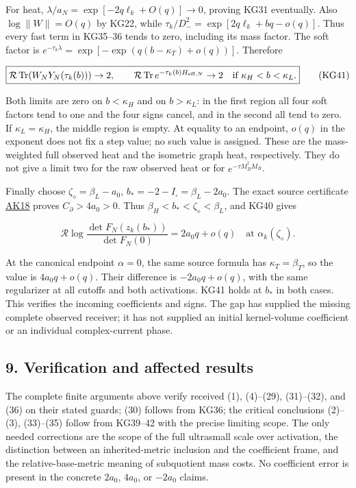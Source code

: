 \documentclass[11pt]{article}
\begin{document}
For heat, \(\lambda/a_N=\exp[-2q\ell_k+O(q)]\to0\), proving KG31 eventually. Also \(\log\|W\|=O(q)\) by KG22, while \(\tau_k/D_-^2=\exp[2q\ell_k+bq-o(q)]\). Thus every fast term in KG35--36 tends to zero, including its mass factor. The soft factor is \(e^{-\tau_k\lambda}=\exp[-\exp(q(b-\kappa_T)+o(q))]\). Therefore

\[
\boxed{\mathcal R\operatorname{Tr}(W_NY_N(\tau_k(b)))\to2,
\qquad\mathcal R\operatorname{Tr}e^{-\tau_k(b)H_{{\rm eff},N}}\to2
\quad\text{if }\kappa_H<b<\kappa_L.}
\tag{KG41}
\]

Both limits are zero on \(b<\kappa_H\) and on \(b>\kappa_L\): in the first region all four soft factors tend to one and the four signs cancel, and in the second all tend to zero. If \(\kappa_L=\kappa_H\), the middle region is empty. At equality to an endpoint, \(o(q)\) in the exponent does not fix a step value; no such value is assigned. These are the mass-weighted full observed heat and the isometric graph heat, respectively. They do not give a limit two for the raw observed heat or for \(e^{-\tau M_B^\dagger M_B}\).

Finally choose \(\zeta_\diamond=\beta_L-a_0\), \(b_*=-2-I_\square=\beta_L-2a_0\). The exact source certificate \href{https://github.com/KokunoYumeto/zeta-function-research-reader/blob/360d3c1d798da434966d35f7e407fc59c14f234b/workbenches/splitzero-tandem/continuations/20260921-critical-inverse-activation/KERNEL_CRITICAL_RECEIVERS.tex}{AK18} proves \(C_\partial>4a_0>0\). Thus \(\beta_H<b_*<\zeta_\diamond<\beta_L\), and KG40 gives

\[
\boxed{\mathcal R\log\frac{\det F_N(z_k(b_*))}{\det F_N(0)}
=2a_0q+o(q)\quad\text{at }\alpha_k(\zeta_\diamond).}
\tag{KG42}
\]

At the canonical endpoint \(\alpha=0\), the same source formula has \(\kappa_T=\beta_T\), so the value is \(4a_0q+o(q)\). Their difference is \(-2a_0q+o(q)\), with the same regularizer at all cutoffs and both activations. KG41 holds at \(b_*\) in both cases. This verifies the incoming coefficients and signs. The gap has supplied the missing complete observed receiver; it has not supplied an initial kernel-volume coefficient or an individual complex-current phase.

\subsection{9. Verification and affected results}\label{verification-and-affected-results}

The complete finite arguments above verify received (1), (4)--(29), (31)--(32), and (36) on their stated guards; (30) follows from KG36; the critical conclusions (2)--(3), (33)--(35) follow from KG39--42 with the precise limiting scope. The only needed corrections are the scope of the full ultrasmall scale over activation, the distinction between an inherited-metric inclusion and the coefficient frame, and the relative-base-metric meaning of subquotient mass costs. No coefficient error is present in the concrete \(2a_0\), \(4a_0\), or \(-2a_0\) claims.
\end{document}
